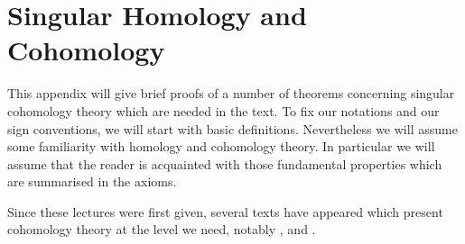 \documentclass[../main]{subfiles}
\begin{document}
\chapter{Singular Homology and Cohomology}\label{app:A}
This appendix will give brief proofs of a number of theorems concerning singular cohomology theory which are needed in the text. To fix our notations and our sign conventions, we will start with basic definitions. Nevertheless we will assume some familiarity with homology and cohomology theory. In particular we will assume that the reader is acquainted with those fundamental properties which are summarised in the \cite{eilenbergsteenrod1952} axioms. 

Since these lectures were first given, several texts have appeared which present cohomology theory at the level we need, notably \cite{hilton1967homology}, \cite{spanier1981} and \cite{dold1972}.











\end{document}
